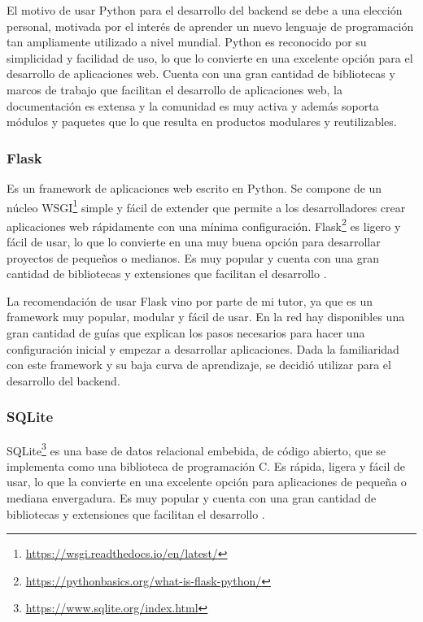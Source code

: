 El motivo de usar Python para el desarrollo del backend se debe a una elección personal, motivada por el interés de aprender un nuevo lenguaje de programación tan ampliamente utilizado a nivel mundial. Python es reconocido por su simplicidad y facilidad de uso, lo que lo convierte en una excelente opción para el desarrollo de aplicaciones web. Cuenta con una gran cantidad de bibliotecas y marcos de trabajo que facilitan el desarrollo de aplicaciones web, la documentación es extensa y la comunidad es muy activa y además soporta módulos y paquetes que lo que resulta en productos modulares y reutilizables.

\subsubsection*{Flask}
Es un framework de aplicaciones web escrito en Python. Se compone de un núcleo WSGI\footnote{\url{https://wsgi.readthedocs.io/en/latest/}} simple y fácil de extender que permite a los desarrolladores crear aplicaciones web rápidamente con una mínima configuración. Flask\footnote{\url{https://pythonbasics.org/what-is-flask-python/}} es ligero y fácil de usar, lo que lo convierte en una muy buena opción para desarrollar proyectos de pequeños o medianos. Es muy popular y cuenta con una gran cantidad de bibliotecas y extensiones que facilitan el desarrollo \cite{grinberg2018flask}.\newline

La recomendación de usar Flask vino por parte de mi tutor, ya que es un framework muy popular, modular y fácil de usar. En la red hay disponibles una gran cantidad de guías que explican los pasos necesarios para hacer una configuración inicial y empezar a desarrollar aplicaciones. Dada la familiaridad con este framework y su baja curva de aprendizaje, se decidió utilizar para el desarrollo del backend.

\subsubsection*{SQLite}

SQLite\footnote{\url{https://www.sqlite.org/index.html}} es una base de datos relacional embebida, de código abierto, que se implementa como una biblioteca de programación C. Es rápida, ligera y fácil de usar, lo que la convierte en una excelente opción para aplicaciones de pequeña o mediana envergadura. Es muy popular y cuenta con una gran cantidad de bibliotecas y extensiones que facilitan el desarrollo \cite{kreibich2010using}.\newline


